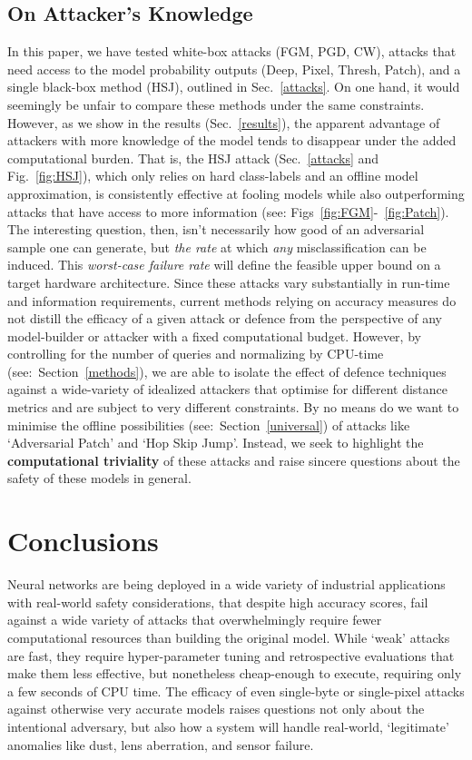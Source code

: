 \documentclass[journal]{IEEEtran}
\begin{document}
\subsection{On Attacker's Knowledge}
In this paper, we have tested white-box attacks (FGM, PGD, CW), attacks that need access to the model probability outputs (Deep, Pixel, Thresh, Patch), and a single black-box method (HSJ), outlined in Sec.~\ref{attacks}.
On one hand, it would seemingly be unfair to compare these methods under the same constraints.
However, as we show in the results (Sec.~\ref{results}), the apparent advantage of attackers with more knowledge of the model tends to disappear under the added computational burden.
That is, the HSJ attack (Sec.~\ref{attacks} and Fig.~\ref{fig:HSJ}), which only relies on hard class-labels and an offline model approximation, is consistently effective at fooling models while also outperforming attacks that have access to more information (see: Figs~\ref{fig:FGM}-~\ref{fig:Patch}).
The interesting question, then, isn't necessarily how good of an adversarial sample one can generate, but \textit{the rate} at which \textit{any} misclassification can be induced.
This \textit{worst-case failure rate} will define the feasible upper bound on a target hardware architecture.
Since these attacks vary substantially in run-time and information requirements, current methods relying on accuracy measures do not distill the efficacy of a given attack or defence from the perspective of any model-builder or attacker with a fixed computational budget.
However, by controlling for the number of queries and normalizing by CPU-time (see:~Section~\ref{methods}), we are able to isolate the effect of defence techniques against a wide-variety of idealized attackers that optimise for different distance metrics and are subject to very different constraints.
By no means do we want to minimise the offline possibilities (see:~Section~\ref{universal}) of attacks like `Adversarial Patch' and `Hop Skip Jump'.
Instead, we seek to highlight the \textbf{computational triviality} of these attacks and raise sincere questions about the safety of these models in general.

\section{Conclusions}

Neural networks are being deployed in a wide variety of industrial applications with real-world safety considerations, that despite high accuracy scores, fail against a wide variety of attacks that overwhelmingly require fewer computational resources than building the original model.
While `weak' attacks are fast, they require hyper-parameter tuning and retrospective evaluations that make them less effective, but nonetheless cheap-enough to execute, requiring only a few seconds of CPU time.
The efficacy of even single-byte or single-pixel attacks against otherwise very accurate models raises questions not only about the intentional adversary, but also how a system will handle real-world, `legitimate' anomalies like dust, lens aberration, and sensor failure.
\end{document}
